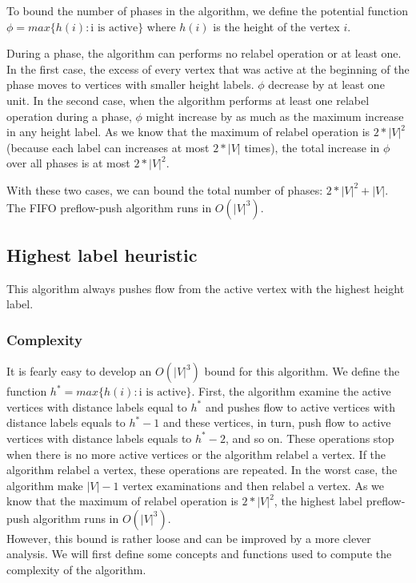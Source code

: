 To bound the number of phases in the algorithm, we define the potential function $\phi = max\{h(i) : \text{i is active}\}$ where $h(i)$ is the height of the vertex $i$.

During a phase, the algorithm can performs no relabel operation or at least one. In the first case, the excess of every vertex that was active at the beginning of the phase moves to vertices with smaller height labels. $\phi$ decrease by at least one unit. In the second case, when the algorithm performs at least one relabel operation during a phase, $\phi$ might increase by as much as the maximum increase in any height label. As we know that the maximum of relabel operation is $2*|V|^2$ (because each label can increases at most $2*|V|$ times), the total increase in $\phi$ over all phases is at most $2*|V|^2$.

With these two cases, we can bound the total number of phases: $2*|V|^2 + |V|$. The FIFO preflow-push algorithm runs in $O(|V|^3)$.

\subsection{Highest label heuristic}

This algorithm always pushes flow from the active vertex with the highest height label. 

\subsubsection{Complexity}

It is fearly easy to develop an $O(|V|^3)$ bound for this algorithm. We define the function $h^{*} = max\{h(i): \text{i is active}\}$. First, the algorithm examine the active vertices with distance labels equal to $h^{*}$ and pushes flow to active vertices with distance labels equals to $h^{*}-1$ and these vertices, in turn, push flow to active vertices with distance labels equals to $h^{*}-2$, and so on. These operations stop when there is no more active vertices or the algorithm relabel a vertex. If the algorithm relabel a vertex, these operations are repeated. In the worst case, the algorithm make $|V| - 1$ vertex examinations and then relabel a vertex. As we know that the maximum of relabel operation is $2*|V|^2$, the highest label preflow-push algorithm runs in $O(|V|^3)$.\\

However, this bound is rather loose and can be improved by a more clever analysis. We will first define some concepts and functions used to compute the complexity of the algorithm.\\

